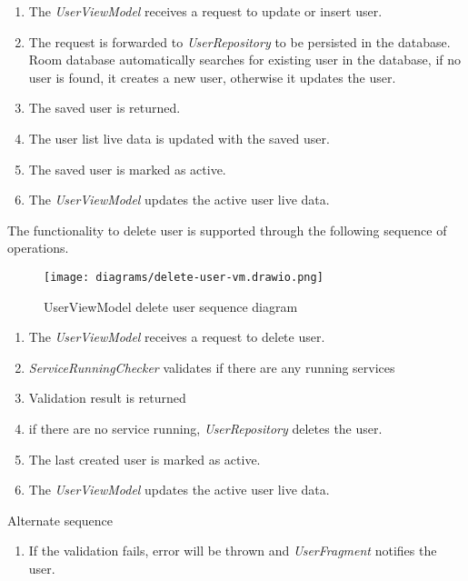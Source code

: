 \begin{enumerate}
    \item The \emph{UserViewModel} receives a request to update or insert user.
    \item The request is forwarded to \emph{UserRepository} to be persisted in the database. Room database automatically searches for existing user in the database, if no user is found, it creates a new user, otherwise it updates the user.
    \item The saved user is returned.
    \item The user list live data is updated with the saved user.
    \item The saved user is marked as active.
    \item The \emph{UserViewModel} updates the active user live data.
\end{enumerate}

The functionality to delete user is supported through the following sequence of operations.
\begin{figure}[H]
    \centering
    \texttt{[image: diagrams/delete-user-vm.drawio.png]}
    \caption{UserViewModel delete user sequence diagram}
    \label{fig:userviewmodel_deleteuser}
\end{figure}

\begin{enumerate}
    \item The \emph{UserViewModel} receives a request to delete user.
    \item \emph{ServiceRunningChecker} validates if there are any running services
    \item Validation result is returned
    \item if there are no service running, \emph{UserRepository} deletes the user.
    \item The last created user is marked as active.
    \item The \emph{UserViewModel} updates the active user live data.
\end{enumerate}

Alternate sequence
\begin{enumerate}[start=4]
    \item If the validation fails, error will be thrown and \emph{UserFragment} notifies the user.
\end{enumerate}